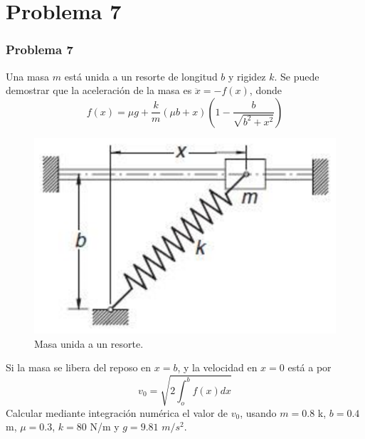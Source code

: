 \documentclass[12pt]{beamer}
\begin{document}
\section{Problema 7}
\begin{frame}
\frametitle{Problema 7}
Una masa $m$ est\'{a} unida a un resorte de longitud $b$ y rigidez $k$. Se puede demostrar que la aceleraci\'{o}n de la masa es $\ddot{x} = -f(x)$, donde
\[f(x) = \mu g + \dfrac{k}{m} (\mu b + x) \left( 1 - \dfrac{b}{\sqrt{b^{2} + x^{2}}} \right)\]
\begin{figure}[H]
	\centering
	\includegraphics[scale=0.45]{Integral_02_Resorte.eps}
	\caption{Masa unida a un resorte.}
\end{figure}
\end{frame}
\begin{frame}
Si la masa se libera del reposo en $x=b$, y la velocidad en $x=0$ est\'{a} a por
\[ v_{0} = \sqrt{2 \int_{o}^{b} f(x) dx}\]
Calcular mediante integraci\'{o}n num\'{e}rica el valor de $v_{0}$, usando $m=0.8$ k, $b=0.4$ m, $\mu=0.3$, $k=80$ N/m y $g=9.81$ $m/s^{2}$.
\end{frame}
\end{document}
